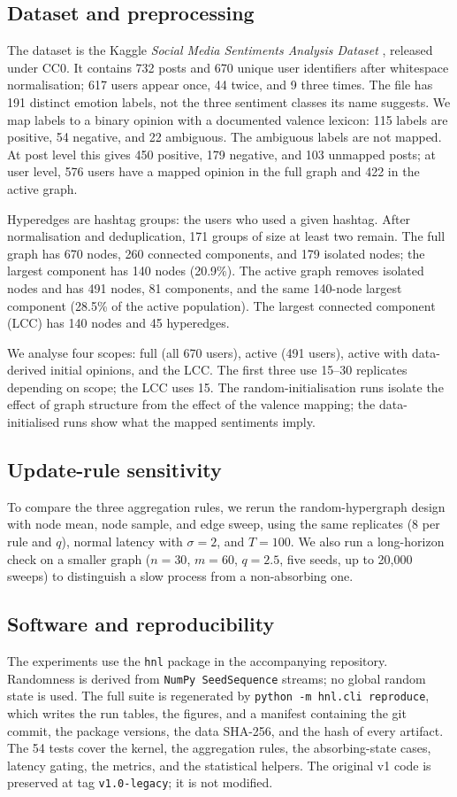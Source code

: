 \documentclass[conference]{IEEEtran}
\begin{document}
\subsection{Dataset and preprocessing}
The dataset is the Kaggle \emph{Social Media Sentiments Analysis Dataset} \cite{parmar2024}, released under CC0. It contains 732 posts and 670 unique user identifiers after whitespace normalisation; 617 users appear once, 44 twice, and 9 three times. The file has 191 distinct emotion labels, not the three sentiment classes its name suggests. We map labels to a binary opinion with a documented valence lexicon: 115 labels are positive, 54 negative, and 22 ambiguous. The ambiguous labels are not mapped. At post level this gives 450 positive, 179 negative, and 103 unmapped posts; at user level, 576 users have a mapped opinion in the full graph and 422 in the active graph.

Hyperedges are hashtag groups: the users who used a given hashtag. After normalisation and deduplication, 171 groups of size at least two remain. The full graph has 670 nodes, 260 connected components, and 179 isolated nodes; the largest component has 140 nodes (20.9\%). The active graph removes isolated nodes and has 491 nodes, 81 components, and the same 140-node largest component (28.5\% of the active population). The largest connected component (LCC) has 140 nodes and 45 hyperedges.

We analyse four scopes: full (all 670 users), active (491 users), active with data-derived initial opinions, and the LCC. The first three use 15--30 replicates depending on scope; the LCC uses 15. The random-initialisation runs isolate the effect of graph structure from the effect of the valence mapping; the data-initialised runs show what the mapped sentiments imply.

\subsection{Update-rule sensitivity}
To compare the three aggregation rules, we rerun the random-hypergraph design with node mean, node sample, and edge sweep, using the same replicates (8 per rule and $q$), normal latency with $\sigma=2$, and $T=100$. We also run a long-horizon check on a smaller graph ($n=30$, $m=60$, $q=2.5$, five seeds, up to 20,000 sweeps) to distinguish a slow process from a non-absorbing one.

\subsection{Software and reproducibility}
The experiments use the \texttt{hnl} package in the accompanying repository. Randomness is derived from \texttt{NumPy SeedSequence} streams; no global random state is used. The full suite is regenerated by \texttt{python -m hnl.cli reproduce}, which writes the run tables, the figures, and a manifest containing the git commit, the package versions, the data SHA-256, and the hash of every artifact. The 54 tests cover the kernel, the aggregation rules, the absorbing-state cases, latency gating, the metrics, and the statistical helpers. The original v1 code is preserved at tag \texttt{v1.0-legacy}; it is not modified.
\end{document}
